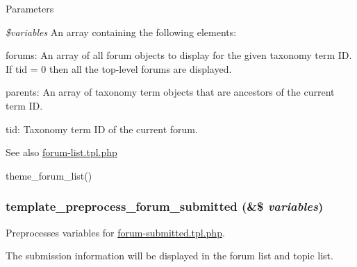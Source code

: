 \begin{DoxyParams}{Parameters}
\item[{\em \$variables}]An array containing the following elements:
\begin{DoxyItemize}
\item forums: An array of all forum objects to display for the given taxonomy term ID. If tid = 0 then all the top-\/level forums are displayed.
\item parents: An array of taxonomy term objects that are ancestors of the current term ID.
\item tid: Taxonomy term ID of the current forum.
\end{DoxyItemize}\end{DoxyParams}
\begin{DoxySeeAlso}{See also}
\hyperlink{forum-list_8tpl_8php}{forum-\/list.tpl.php} 

theme\_\-forum\_\-list() 
\end{DoxySeeAlso}
\hypertarget{forum_8module_abb16229c10878e4cf5723284d194ca9c}{
\subsubsection[{template\_\-preprocess\_\-forum\_\-submitted}]{\setlength{\rightskip}{0pt plus 5cm}template\_\-preprocess\_\-forum\_\-submitted (\&\$ {\em variables})}}
\label{forum_8module_abb16229c10878e4cf5723284d194ca9c}
Preprocesses variables for \hyperlink{forum-submitted_8tpl_8php}{forum-\/submitted.tpl.php}.

The submission information will be displayed in the forum list and topic list.


